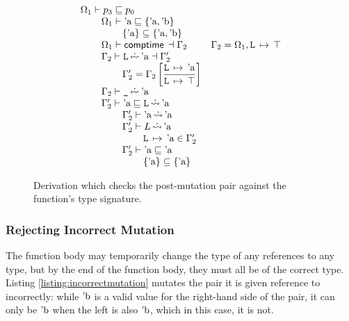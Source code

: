 \documentclass[12pt,twoside]{report}
\begin{document}
\begin{figure}
  \[\begin{array}{ll}
    \Omega_1 \vdash p_3 \subtype p_0 \\
    \otab \Omega_1 \vdash \atom{a} \subtype \{\atom{a}, \atom{b}\} \\
    \otab\otab \{\atom{a}\} \subseteq \{\atom{a}, \atom{b}\} \\
    \otab \Omega_1 \vdash \comptime{} \dashv \Gamma_2 &
      \Gamma_2 = \Omega_1,\absmapm{L}{\top} \\
    \otab \Gamma_2 \vdash \mono{L} \erasedwritearrow \atom{a} \dashv \Gamma_2' \\
    \otab\otab \Gamma_2' = \Gamma_2\left[\dfrac{\absmapm{L}{\atom{a}}}{\absmapm{L}{\top}}\right] \\
    \otab \Gamma_2 \vdash \mono{\_} \erasedwritearrow \atom{a} \\
    \otab \Gamma_2' \vdash \atom{a} \subtype \mono{L} \erasedreadarrow \atom{a} \\
    \otab\otab \Gamma_2' \vdash \atom{a} \erasedreadarrow \atom{a} \\
    \otab\otab \Gamma_2' \vdash L \erasedreadarrow \atom{a} \\
    \otab\otab\otab \absmapm{L}{\atom{a}} \in \Gamma_2' \\
    \otab\otab \Gamma_2' \vdash \atom{a} \subtype \atom{a} \\
    \otab\otab\otab \{\atom{a}\} \subseteq \{\atom{a}\} \\
  \end{array}\]
  \caption{Derivation which checks the post-mutation pair against the  function's type signature.}
  \label{fig:postmutationderivation}
\end{figure}

\subsubsection{Rejecting Incorrect Mutation}
The function body may temporarily change the type of any references to any type, but by the end of the function body, they must all be of the correct type. Listing \ref{listing:incorrectmutation} mutates the pair it is given reference to incorrectly: while $\text{'b}$ is a valid value for the right-hand side of the pair, it can only be $\text{'b}$ when the left is also $\text{'b}$, which in this case, it is not.
\end{document}
